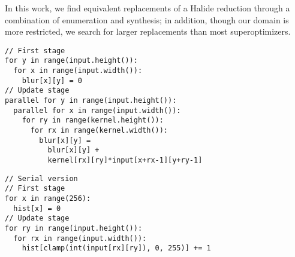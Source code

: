 In this work, we find equivalent replacements of a Halide reduction through a combination of enumeration and synthesis; in addition, though our domain is more restricted, we search for larger replacements than most superoptimizers.

\begin{lstlisting}[caption={Convolution blur kernel is easily parallelizable across \code{Var} $x$ adn $y$.}, label={lst:blur_loopness}]
// First stage
for y in range(input.height()):
  for x in range(input.width()):
    blur[x][y] = 0
// Update stage
parallel for y in range(input.height()):
  parallel for x in range(input.width()):
    for ry in range(kernel.height()):
      for rx in range(kernel.width()):    
        blur[x][y] = 
          blur[x][y] + 
          kernel[rx][ry]*input[x+rx-1][y+ry-1] 
\end{lstlisting}

\begin{lstlisting}[caption={Histogram of an image is hard to parallelize since its update stage does not involve \code{RVar}s.}, label={lst:histogram_loopness}]
// Serial version
// First stage
for x in range(256):
  hist[x] = 0
// Update stage
for ry in range(input.height()):
  for rx in range(input.width()):
    hist[clamp(int(input[rx][ry]), 0, 255)] += 1
\end{lstlisting}

